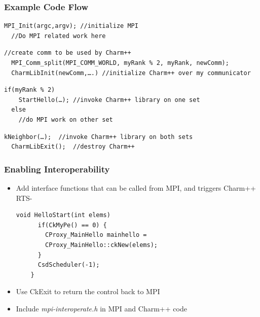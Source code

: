 \begin{frame}[fragile]
  \frametitle{Example Code Flow}
  \begin{lstlisting}[basicstyle=\footnotesize]
  MPI_Init(argc,argv); //initialize MPI
  //Do MPI related work here
  \end{lstlisting}
  \pause
  \begin{lstlisting}[basicstyle=\footnotesize]
  //create comm to be used by Charm++
  MPI_Comm_split(MPI_COMM_WORLD, myRank % 2, myRank, newComm); 
  CharmLibInit(newComm,….) //initialize Charm++ over my communicator
  \end{lstlisting}
  \pause
  \begin{lstlisting}[basicstyle=\footnotesize]
  if(myRank % 2) 
    StartHello(…); //invoke Charm++ library on one set
  else 
    //do MPI work on other set
  \end{lstlisting}
  \pause
  \begin{lstlisting}[basicstyle=\footnotesize]
  kNeighbor(…);  //invoke Charm++ library on both sets
  CharmLibExit();  //destroy Charm++ 
  \end{lstlisting}
\end{frame}

\begin{frame}[fragile]

  \frametitle{Enabling Interoperability}

  \begin{itemize}
    \item Add interface functions that can be called from MPI, and triggers
    Charm++ RTS-
    \begin{lstlisting}[basicstyle=\footnotesize]
    void HelloStart(int elems)
      if(CkMyPe() == 0) {
        CProxy_MainHello mainhello =
        CProxy_MainHello::ckNew(elems); 
      }
      CsdScheduler(-1);
    }
    \end{lstlisting}
  \pause
  \item Use CkExit to return the control back to MPI
  \item Include {\em mpi-interoperate.h} in MPI and Charm++ code
  \end{itemize}
\end{frame}



